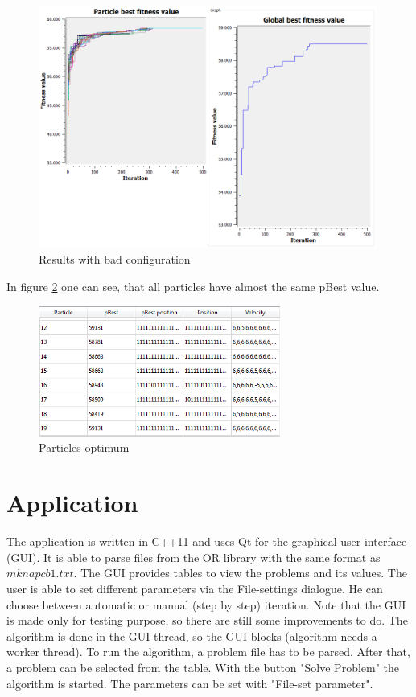 \documentclass{article}
\begin{document}
\begin{figure}[H]
    \centering
    \includegraphics[width=420px]{images/p20_500it_p30_badConfig_both.png}
    \caption{Results with bad configuration}
    \label{fig-bad-config}
\end{figure}

In figure \ref{fig-particles_optimum} one can see, that all particles have almost the same pBest value.

\begin{figure}[H]
    \centering
    \includegraphics[width=300px]{images/particles_optimum2.PNG}
    \caption{Particles optimum}
    \label{fig-particles_optimum}
\end{figure}

\section{Application}
\label{lbl-app}
The application is written in C++11 and uses Qt for the graphical user interface (GUI). It is able to parse files from the OR library with the same format as $mknapcb1.txt$. The GUI   provides tables to view the problems and its values. The user is able to set different parameters via the File-settings dialogue. He can choose between automatic or manual (step by step) iteration. Note that the GUI is made only for testing purpose, so there are still some improvements to do. The algorithm is done in the GUI thread, so the GUI blocks (algorithm needs a worker thread). To run the algorithm, a problem file has to be parsed. After that, a problem can be selected from the table. With the button "Solve Problem" the algorithm is started. The parameters can be set with "File-set parameter".
\end{document}
